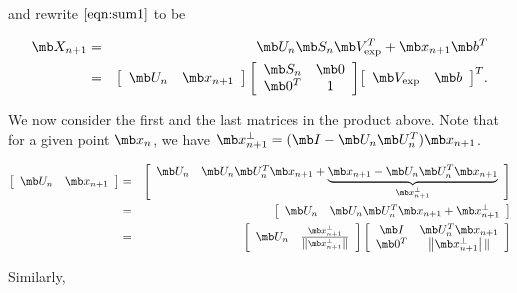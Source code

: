 and rewrite $\eqref{eqn:sum1}$ to be


\begin{eqnarray}
    \mb X_{n+1} &=& \mb U_n {\mb S_n} {\mb V_{\text{exp}}^T} + {\mb x_{n+1}} {\mb b^T} \\
    &=& \left[ \begin{array}{cc} {\mb U_n} & {\mb x_{n+1}} \end{array} \right] {\left[ \begin{array}{cc}
    \mb S_n & \mb 0  \\
    \mb 0^T     &  1
    \end{array} \right]} {\left[ \begin{array}{cc} \mb V_{\text{exp}} & \mb b \end{array} \right]^T}. \label{eqn:matrix_mult}
\end{eqnarray}

We now consider the first and the last matrices in the product above. Note that for a given point $\mb x_n$, we have  $\mb x_{n+1}^\perp = (\mb I - \mb U_n \mb U_n^T) \mb x_{n+1}$.

\begin{eqnarray}
    \left[ \begin{array}{cc} \mb U_n & \mb x_{n+1} \end{array} \right] &=& \left[ \begin{array}{cc} \mb U_n & \mb U_n \mb U^T_n \mb x_{n+1} + \underbrace{\mb x_{n+1} - \mb U_n \mb U^T_n \mb x_{n+1}}_\text{$\mb x^\perp_{n+1}$} \end{array} \right] \\
    &=& \left[ \begin{array}{cc} \mb U_n & \mb U_n \mb U^T_n \mb x_{n+1} + \mb x^\perp_{n+1} \end{array} \right] \\
    &=& \left[ \begin{array}{cc} \mb U_n & \frac{\mb x_{n+1}^\perp}{\left \|\mb x_{n+1}^\perp \right \|} \end{array} \right] \left[ \begin{array}{cc} \mb I & \mb U_n^T \mb x_{n+1} \\
    \mb 0^T & \left\| \mb x^\perp_{n+1} \right|\|  \end{array} \right]
\end{eqnarray}

Similarly,

